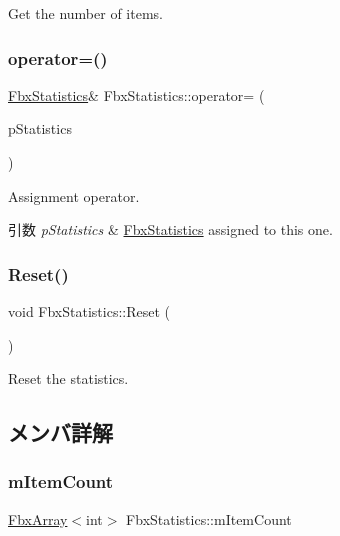 Get the number of items. 

\mbox{\label{class_fbx_statistics_a176871e5e6bf03a71a2ae7f4dd277403}} 
\subsubsection{\texorpdfstring{operator=()}{operator=()}}
{\footnotesize\ttfamily \hyperlink{class_fbx_statistics}{Fbx\+Statistics}\& Fbx\+Statistics\+::operator= (\begin{DoxyParamCaption}\item[{const \hyperlink{class_fbx_statistics}{Fbx\+Statistics} \&}]{p\+Statistics }\end{DoxyParamCaption})}

Assignment operator. 
\begin{DoxyParams}{引数}
{\em p\+Statistics} & \hyperlink{class_fbx_statistics}{Fbx\+Statistics} assigned to this one. \\
\hline
\end{DoxyParams}
\mbox{\label{class_fbx_statistics_ad0cf2f0dafc61cb5c99b8ad63d86f0c7}} 
\subsubsection{\texorpdfstring{Reset()}{Reset()}}
{\footnotesize\ttfamily void Fbx\+Statistics\+::\+Reset (\begin{DoxyParamCaption}{ }\end{DoxyParamCaption})}



Reset the statistics. 



\subsection{メンバ詳解}
\mbox{\label{class_fbx_statistics_a9754af27b7b5d98fb085595e633370e8}} 
\subsubsection{\texorpdfstring{m\+Item\+Count}{mItemCount}}
{\footnotesize\ttfamily \hyperlink{class_fbx_array}{Fbx\+Array}$<$int$>$ Fbx\+Statistics\+::m\+Item\+Count\hspace{0.3cm}{\ttfamily [protected]}}




